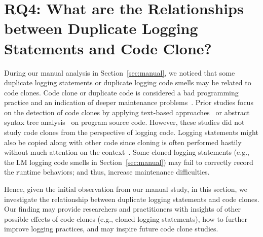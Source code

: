 \section{RQ4: What are the Relationships between Duplicate Logging Statements and Code Clone?}
\label{sec:clone}


 During our manual analysis in Section~\ref{sec:manual}, we noticed that some duplicate logging statements or duplicate logging code smells may be related to code clones. Code clone or duplicate code is considered a bad programming practice and an indication of deeper maintenance problems~\cite{refactoring1999}.
Prior studies focus on the detection of code clones by applying text-based approaches~\cite{cpminer, kamiya2002} or abstract syntax tree analysis~\cite{baxter1998, jian2007} on program source code. However, these studies did not study code clones from the perspective of logging code. Logging statements might also be copied along with other code since cloning is often performed hastily without much attention on the context~\cite{5463343}. Some cloned logging statements (e.g., the LM logging code smells in Section~\ref{sec:manual}) may fail to correctly record the runtime behaviors; and thus, increase maintenance difficulties.

Hence, given the initial observation from our manual study, in this section, we investigate the relationship between duplicate logging statements and code clones. Our finding may provide researchers and practitioners with insights of other possible effects of code clones (e.g., cloned logging statements), how to further improve logging practices, and may inspire future code clone studies. %



